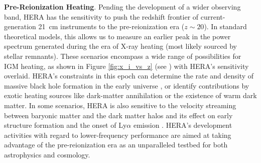 \documentclass[preprint]{aastex}
\newcommand{\Mycitep}[1]{{\bf \citep{#1}}}
\newcommand{\Mycitealt}[1]{{\bf \citealt{#1}}}
\newcommand{\compress}{\vspace{-0.25in}}
\begin{document}
{\bf Pre-Reionization Heating}. Pending the development of a wider observing band,
HERA has the sensitivity to
push the redshift frontier of current-generation 21~cm instruments
to the pre-reionization era ($z \sim 20$).  In standard theoretical models, this allows us to measure an earlier
peak in the power spectrum generated during the
era of X-ray heating (most likely sourced by stellar remnants).  These scenarios encompass a
wide range of possibilities for IGM heating, as shown in Figure
\ref{fig:x_i_vs_z} (see  \Mycitealt{mesinger_et_al2013}) with HERA's sensitivity
overlaid.  HERA's constraints in this epoch can determine the rate and density
of massive black hole formation in the early universe
\Mycitep{pritchard_loeb2010}, or identify contributions by exotic heating sources like dark-matter
annihilation or the existence of warm dark matter.  In some scenarios, 
HERA is also  sensitive to the velocity streaming
between baryonic matter and the dark matter halos and its effect on early
structure formation and the onset of Ly$\alpha$ emission
\citep{visbal_et_al2012}.  HERA's development activities with regard to lower-frequency
performance are aimed at taking advantage of
the pre-reionization era as an unparalleled testbed for both astrophysics and
cosmology.



\end{document}
